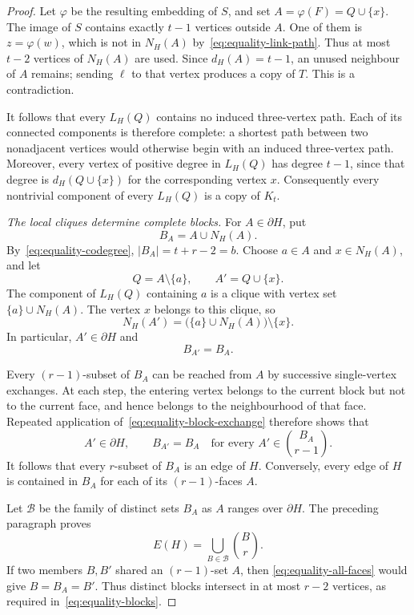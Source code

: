 \documentclass[10pt,a4paper]{amsart}
\newcommand{\sh}{\partial}
\begin{document}
\begin{proof}
		\bigskip
		
		Let $\varphi$ be the resulting embedding of $S$, and set
		$A=\varphi(F)=Q\cup\{x\}$. The image of $S$ contains exactly
		$t-1$ vertices outside $A$. One of them is $z=\varphi(w)$,
		which is not in $N_H(A)$ by~\eqref{eq:equality-link-path}.
		Thus at most $t-2$ vertices of $N_H(A)$ are used. Since
		$d_H(A)=t-1$, an unused neighbour of $A$ remains; sending
		$\ell$ to that vertex produces a copy of $T$. This is a
		contradiction.
		
		\bigskip
		
		It follows that every $L_H(Q)$ contains no induced
		three-vertex path. Each of its connected components is
		therefore complete: a shortest path between two nonadjacent
		vertices would otherwise begin with an induced three-vertex
		path. Moreover, every vertex of positive degree in $L_H(Q)$
		has degree $t-1$, since that degree is
		$d_H(Q\cup\{x\})$ for the corresponding vertex $x$.
		Consequently every nontrivial component of every $L_H(Q)$
		is a copy of $K_t$.
		
		\medskip\noindent
		\emph{The local cliques determine complete blocks.}
		For $A\in\sh H$, put
		\[
		B_A=A\cup N_H(A).
		\]
		By~\eqref{eq:equality-codegree}, $|B_A|=t+r-2=b$.
		Choose $a\in A$ and $x\in N_H(A)$, and let
		\[
		Q=A\setminus\{a\},\qquad A'=Q\cup\{x\}.
		\]
		The component of $L_H(Q)$ containing $a$ is a clique with
		vertex set $\{a\}\cup N_H(A)$. The vertex $x$ belongs to
		this clique, so
		\[
		N_H(A')=
		\bigl(\{a\}\cup N_H(A)\bigr)\setminus\{x\}.
		\]
		In particular, $A'\in\sh H$ and
		\begin{equation}\label{eq:equality-block-exchange}
			B_{A'}=B_A.
		\end{equation}
		
		Every $(r-1)$-subset of $B_A$ can be reached from $A$ by
		successive single-vertex exchanges. At each step, the entering
		vertex belongs to the current block but not to the current
		face, and hence belongs to the neighbourhood of that face.
		Repeated application of~\eqref{eq:equality-block-exchange}
		therefore shows that
		\begin{equation}\label{eq:equality-all-faces}
			A'\in\sh H,\qquad B_{A'}=B_A
			\quad\text{for every }A'\in\binom{B_A}{r-1}.
		\end{equation}
		It follows that every $r$-subset of $B_A$ is an edge of $H$.
		Conversely, every edge of $H$ is contained in $B_A$ for each
		of its $(r-1)$-faces $A$.
		
		Let $\mathcal B$ be the family of distinct sets $B_A$ as
		$A$ ranges over $\sh H$. The preceding paragraph proves
		\[
		E(H)=\bigcup_{B\in\mathcal B}\binom Br.
		\]
		If two members $B,B'$ shared an $(r-1)$-set $A$, then
		\eqref{eq:equality-all-faces} would give $B=B_A=B'$.
		Thus distinct blocks intersect in at most $r-2$ vertices,
		as required in~\eqref{eq:equality-blocks}.
		

\end{proof}
\end{document}
